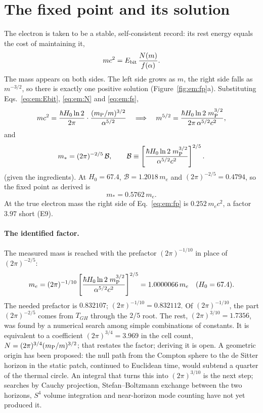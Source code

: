 \section{The fixed point and its solution}\label{sec:em:fixed}
The electron is taken to be a stable, self-consistent record: its rest energy equals the cost of maintaining it,
\begin{equation}
mc^2=E_{\rm bit}\,\frac{N(m)}{f(\alpha)}.\label{eq:em:fp}
\end{equation}
\conjecture{} The mass appears on both sides. The left side grows as $m$, the right side falls as $m^{-3/2}$, so there is exactly one positive
solution (Figure~\ref{fig:em:fp}a). \derived{} Substituting Eqs.~\eqref{eq:em:Ebit}, \eqref{eq:em:N} and \eqref{eq:em:fs},
\begin{equation}
mc^2=\frac{\hbar H_0\ln2}{2\pi}\cdot\frac{(m_{\mathrm P}/m)^{3/2}}{\alpha^{5/2}}\quad\Longrightarrow\quad
m^{5/2}=\frac{\hbar H_0\ln2\;m_{\mathrm P}^{3/2}}{2\pi\,\alpha^{5/2}c^2},\label{eq:em:m52}
\end{equation}
and
\begin{equation}
m_*=(2\pi)^{-2/5}\,\mathcal B,\qquad\mathcal B\equiv\left[\frac{\hbar H_0\ln2\;m_{\mathrm P}^{3/2}}{\alpha^{5/2}c^2}\right]^{2/5}.\label{eq:em:mstar}
\end{equation}
\derived{} (given the ingredients). At $H_0=67.4$, $\mathcal B=1.2018\,m_e$ and $(2\pi)^{-2/5}=0.4794$, so the fixed point as derived is
\begin{equation}
m_*=0.5762\,m_e.\label{eq:em:short}
\end{equation}
\calc{} At the true electron mass the right side of Eq.~\eqref{eq:em:fp} is $0.252\,m_ec^2$, a factor $3.97$ short (E9). \calc

\paragraph{The identified factor.} The measured mass is reached with the prefactor $(2\pi)^{-1/10}$ in place of $(2\pi)^{-2/5}$:
\begin{equation}
m_e=(2\pi)^{-1/10}\left[\frac{\hbar H_0\ln2\;m_{\mathrm P}^{3/2}}{\alpha^{5/2}c^2}\right]^{2/5}=1.0000066\,m_e\quad(H_0=67.4).\label{eq:em:result}
\end{equation}
The needed prefactor is $0.832107$; $(2\pi)^{-1/10}=0.832112$. \calc{} Of $(2\pi)^{-1/10}$, the part $(2\pi)^{-2/5}$ comes from $T_{GH}$ through
the $2/5$ root. The rest, $(2\pi)^{3/10}=1.7356$, was found by a numerical search among simple combinations of constants. \fitted{} It is
equivalent to a coefficient $(2\pi)^{3/4}=3.969$ in the cell count, $N=(2\pi)^{3/4}(m_{\mathrm P}/m)^{3/2}$; that restates the factor; deriving it is open. \calc{} A geometric origin has been proposed: the null path from the Compton sphere to the de Sitter horizon in the static patch, continued to
Euclidean time, would subtend a quarter of the thermal circle. An integral that turns this into $(2\pi)^{3/10}$ is the next step; searches by Cauchy projection, Stefan--Boltzmann exchange between the two horizons, $S^4$ volume integration and near-horizon mode counting have not yet produced it. \openprob


